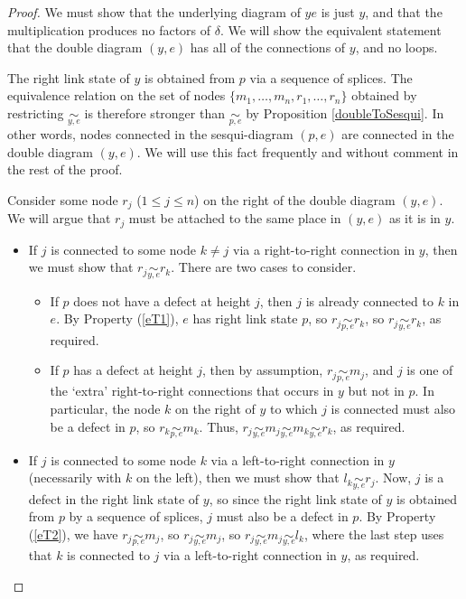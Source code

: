 \documentclass[12pt]{amsart}
\theoremstyle{plain}
\theoremstyle{definition} \newtheorem{definition}[theorem]{Definition}
\theoremstyle{plain}
\theoremstyle{plain} \newtheorem{proposition}[theorem]{Proposition}
\theoremstyle{plain} \newtheorem{conjecture}[theorem]{Conjecture}
\theoremstyle{plain} \newtheorem{corollary}[theorem]{Corollary}
\theoremstyle{remark} \newtheorem{claim}[theorem]{Claim}
\theoremstyle{remark} \newtheorem{remark}[theorem]{Remark}
\theoremstyle{remark} \newtheorem{example}[theorem]{Example}
\theoremstyle{remark} \newtheorem{comment}[theorem]{Comment}
\theoremstyle{definition} \newtheorem{question}[theorem]{Question}
\newcommand{\mOne}{splice}
\begin{document}
\begin{proof} We must show that the underlying diagram of $y e$ is just $y$, and that the multiplication produces no factors of $\delta$. We will show the equivalent statement that the double diagram $(y,e)$ has all of the connections of $y$, and no loops.

The right link state of $y$ is obtained from $p$ via a sequence of {\mOne}s. The equivalence relation on the set of nodes $\{m_1, \dots, m_n, r_1, \dots, r_n\}$ obtained by restricting $\underset{y,e}{\sim}$ is therefore stronger than $\underset{p,e}{\sim}$ by Proposition \ref{doubleToSesqui}. In other words, nodes connected in the sesqui-diagram $(p,e)$ are connected in the double diagram $(y,e)$. We will use this fact frequently and without comment in the rest of the proof.

Consider some node $r_j$ ($1 \leq j \leq n$) on the right of the double diagram $(y,e)$. We will argue that $r_j$ must be attached to the same place in $(y,e)$ as it is in $y$.

\begin{itemize}
    \item If $j$ is connected to some node $k \neq j$ via a right-to-right connection in $y$, then we must show that $r_j \underset{y,e}{\sim} r_k$. There are two cases to consider.
    \begin{itemize}
        \item If $p$ does not have a defect at height $j$, then $j$ is already connected to $k$ in $e$. By Property (\ref{eT1}), $e$ has right link state $p$, so $r_j \underset{p,e}{\sim} r_k$, so $r_j \underset{y,e}{\sim} r_k$, as required.
        \item If $p$ has a defect at height $j$, then by assumption, $r_j \underset{p,e}{\sim} m_j$, and $j$ is one of the `extra' right-to-right connections that occurs in $y$ but not in $p$. In particular, the node $k$ on the right of $y$ to which $j$ is connected must also be a defect in $p$, so $r_k \underset{p,e}{\sim} m_k$. Thus, $r_j \underset{y,e}{\sim} m_j \underset{y,e}{\sim} m_k \underset{y,e}{\sim} r_k$, as required.
    \end{itemize}
    \item If $j$ is connected to some node $k$ via a left-to-right connection in $y$ (necessarily with $k$ on the left), then we must show that $l_k \underset{y,e}{\sim} r_j$. Now, $j$ is a defect in the right link state of $y$, so since the right link state of $y$ is obtained from $p$ by a sequence of {\mOne}s, $j$ must also be a defect in $p$. By Property (\ref{eT2}), we have $r_j \underset{p,e}{\sim} m_j$, so $r_j \underset{y,e}{\sim} m_j$, so $r_j \underset{y,e}{\sim} m_j \underset{y,e}{\sim} l_k$, where the last step uses that $k$ is connected to $j$ via a left-to-right connection in $y$, as required.
\end{itemize}


\end{proof}
\end{document}
